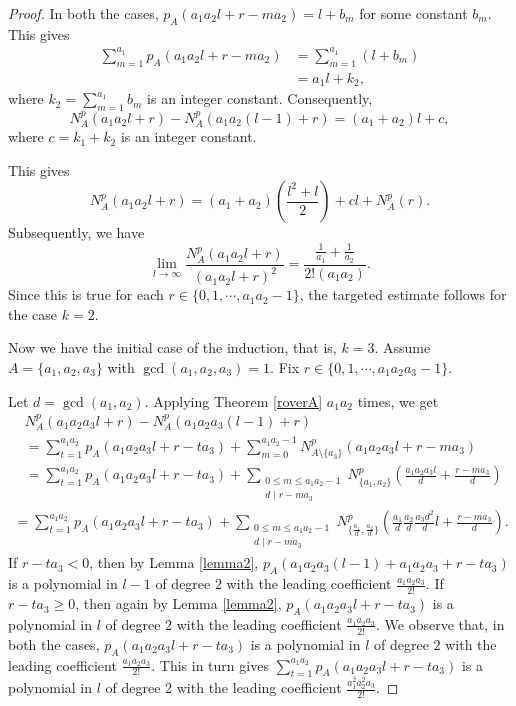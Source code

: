 \documentclass[10pt,a4paper]{amsart}
\begin{document}
\begin{proof}
In both the cases, $p_A(a_1a_2l+r-ma_2)=l+b_m$ for some constant $b_m$. This gives
\begin{align*}
\sum_{m=1}^{a_1}p_A(a_1a_2l+r-ma_2)&=\sum_{m=1}^{a_1}(l+b_m)\\
&=a_1l+k_2,
\end{align*}
where $k_2=\sum_{m=1}^{a_1}b_m$ is an integer constant. \newline 
Consequently,
\[N_A^p(a_1a_2l+r)-N_A^p(a_1a_2(l-1)+r)=(a_1+a_2)l+c,
\]
where $c=k_1+k_2$ is an integer constant.

This gives
\[N_A^p(a_1a_2l+r)=(a_1+a_2)\left(\frac{l^2+l}{2}\right)+cl+N_A^p(r).
\]
Subsequently, we have
\[\lim_{l\to\infty}\frac{N_A^p(a_1a_2l+r)}{(a_1a_2l+r)^2}
=\frac{\frac{1}{a_1}+\frac{1}{a_2}}{2!(a_1a_2)}.
\]
Since this is true for each $r\in\{0,1,\cdots ,a_1a_2-1\}$, the targeted estimate follows for the case $k=2$.

Now we have the initial case of the induction, that is, $k=3$. Assume $A=\{a_1,a_2,a_3\}$ with $\gcd(a_1,a_2,a_3)=1$. Fix $r\in\{0,1,\cdots ,a_1a_2a_3-1\}$. 

Let $d=\gcd(a_1,a_2)$. Applying Theorem \ref{roverA} $a_1a_2$ times, we get
\begin{align*} 
&N_A^p(a_1a_2a_3l+r)-N_A^p(a_1a_2a_3(l-1)+r)\\ 
&=\sum_{t=1}^{a_1a_2}p_A(a_1a_2a_3l+r-ta_3)+\sum_{m=0}^{a_1a_2-1}N_{A\setminus \{a_3\}}^p(a_1a_2a_3l+r-ma_3)\ \ \ \ \ \ \ \ \ \ \ \ \ \ \ \ \ \ \ \ \ \ \\ 
&=\sum_{t=1}^{a_1a_2}p_A(a_1a_2a_3l+r-ta_3)+\sum_{\substack{0\leq m\leq a_1a_2-1\\ d\mid r-ma_3}}N_{ \{a_1,a_2\}}^p\left(\frac{a_1a_2a_3l}{d}+\frac{r-ma_3}{d}\right)
\end{align*}
\begin{align}\label{eqn1}
=\sum_{t=1}^{a_1a_2}p_A(a_1a_2a_3l+r-ta_3)+\sum_{\substack{0\leq m\leq a_1a_2-1\\ d\mid r-ma_3}}N^p_{\{\frac{a_1}{d},\frac{a_2}{d}\}}\left(\frac{a_1}{d}\frac{a_2}{d}\frac{a_3d^2}{d}l+\frac{r-ma_3}{d}\right).\ \ 
\end{align}
If $r-ta_3<0$, then by Lemma \ref{lemma2}, $p_A(a_1a_2a_3(l-1)+a_1a_2a_3+r-ta_3)$ is a polynomial in $l-1$ of degree $2$ with the leading coefficient $\frac{a_1a_2a_3}{2!}$. If $r-ta_3\geq 0$, then again by Lemma \ref{lemma2}, $p_A(a_1a_2a_3l+r-ta_3)$ is a polynomial in $l$ of degree $2$ with the leading coefficient $\frac{a_1a_2a_3}{2!}$. We observe that, in both the cases, $p_A(a_1a_2a_3l+r-ta_3)$ is a polynomial in $l$ of degree $2$ with the leading coefficient $\frac{a_1a_2a_3}{2!}$. This in turn gives $\sum_{t=1}^{a_1a_2}p_A(a_1a_2a_3l+r-ta_3)$ is a polynomial in $l$ of degree 2 with the leading coefficient $\frac{a_1^2a_2^2a_3}{2!}$.  


\end{proof}
\end{document}
